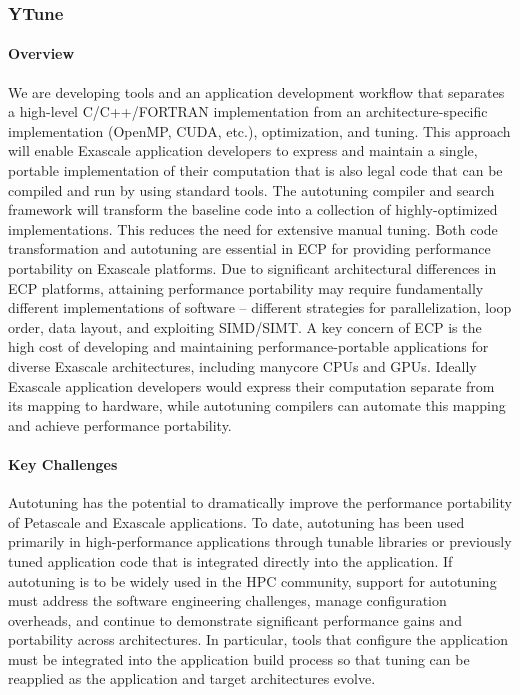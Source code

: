 \subsubsection{ YTune} 

\paragraph{Overview}

We are developing tools and an application development workflow that separates a high-level C/C++/FORTRAN implementation from an architecture-specific implementation (OpenMP, CUDA, etc.), optimization, and  tuning.   This  approach
will enable Exascale application  developers to express and  maintain a
single, portable implementation of their computation that is also legal code
that can be compiled and run by using standard tools.   The autotuning compiler
and search framework will transform the baseline code into a   collection of
highly-optimized implementations. This reduces the need for extensive manual tuning.
Both code transformation and autotuning are essential in ECP for providing
performance portability on Exascale platforms.  Due to significant architectural
differences in ECP platforms, attaining performance portability may  require
fundamentally different  implementations of software -- different strategies for
parallelization, loop order,  data layout, and exploiting SIMD/SIMT.  A key
concern of ECP is the high cost of developing  and maintaining
performance-portable applications for  diverse Exascale architectures, including
manycore CPUs and GPUs. 
Ideally Exascale application developers would express their
computation separate from   its mapping to hardware, while autotuning compilers can automate this mapping and achieve performance portability.

\paragraph{Key  Challenges}
Autotuning has the potential to dramatically improve the performance portability of Petascale and Exascale applications.  To date, autotuning has been used primarily in high-performance applications through tunable libraries or previously tuned application code that is integrated directly into the application.
If autotuning is to be widely used in the HPC community,
support for autotuning must address the software engineering challenges, manage configuration overheads, and continue to demonstrate significant performance gains and portability across architectures.
In particular, tools that configure the application must be integrated into the application build process so that tuning can be reapplied as the application and target architectures evolve.

